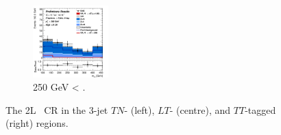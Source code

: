 \begin{figure}[h!]
\begin{subfigure}[b]{\textwidth}
        \includegraphics[width=0.32\textwidth]{Images/VH/Own_fit/postfit_VHcc/Region_distmBB_BMin250_DCRHigh_J3_TTypett_incJet1_T2_L2_Y6051_GlobalFit_conditionnal_mu1.png}
        \caption{250 GeV < \ptv.}
        \label{fig:plots_VHcc_2L_250_CRH_3J}
    \end{subfigure}
    \caption{The 2L \highdr\ CR in the 3-jet $TN$- (left), $LT$- (centre), and $TT$-tagged (right) regions.}
    \label{fig:plots_VHcc_2L_CRH_3J}
\end{figure}

\vspace*{\fill} \newpage
\vspace*{\fill} 

